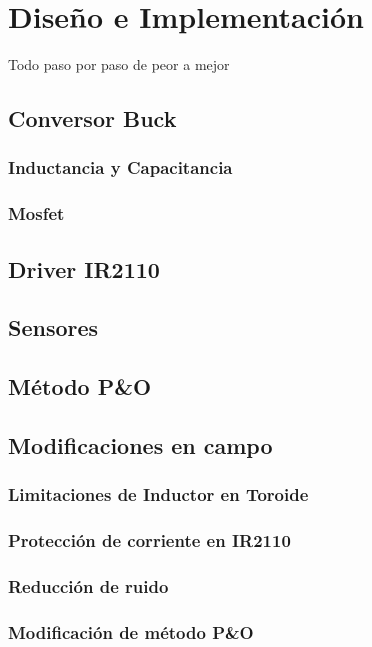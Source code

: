 \chapter{Diseño e Implementación}
\label{Diseño e Implementación}
Todo paso por paso de peor a mejor
\section{Conversor Buck}
\subsection{Inductancia y Capacitancia}
\subsection{Mosfet}
\section{Driver IR2110}
\section{Sensores}
\section{Método P\&O}
\section{Modificaciones en campo}
\subsection{Limitaciones de Inductor en Toroide}
\subsection{Protección de corriente en IR2110}
\subsection{Reducción de ruido}
\subsection{Modificación de método P\&O}
